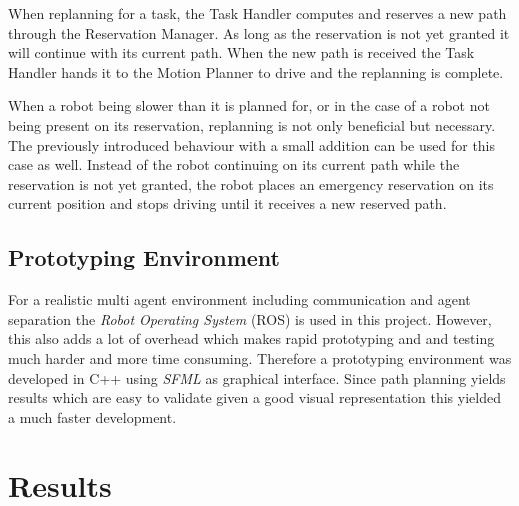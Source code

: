 \documentclass[journal]{IEEEtran}
\begin{document}
When replanning for a task, the Task Handler computes and reserves a new path through the Reservation Manager.
As long as the reservation is not yet granted it will continue with its current path.
When the new path is received the Task Handler hands it to the Motion Planner to drive and the replanning is complete.

When a robot being slower than it is planned for, or in the case of a robot not being present on its reservation, replanning is not only beneficial but necessary.
The previously introduced behaviour with a small addition can be used for this case as well. Instead of the robot continuing on its current path while the reservation is not yet granted, the robot places an emergency reservation on its current position and stops driving until it receives a new reserved path.

\subsection{Prototyping Environment}
\label{subsec:prototyping_environment}
For a realistic multi agent environment including communication and agent separation the \emph{Robot Operating System} (ROS) is used in this project. However, this also adds a lot of overhead which makes rapid prototyping and and testing much harder and more time consuming. Therefore a prototyping environment was developed in C++ using \emph{SFML}\cite{sfml} as graphical interface. Since path planning yields results which are easy to validate given a good visual representation this yielded a much faster development.

\section{Results}
\label{sec:results}
\end{document}
